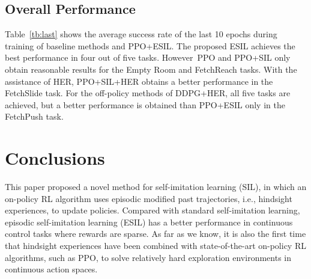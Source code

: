 \subsection{Overall Performance}
{Table~\ref{tb:last}} shows the average success rate of the last 10 epochs during training of baseline methods and PPO+ESIL. The proposed ESIL achieves the best performance in four out of five tasks. However~PPO and PPO+SIL  only obtain reasonable results for the Empty Room and FetchReach tasks. With the assistance of HER, PPO+SIL+HER obtains a better performance in the FetchSlide task. {For the off-policy methods of DDPG+HER, all five tasks are achieved, but a better performance is  obtained than PPO+ESIL only in the FetchPush task}.

\begin{table}[H]
  \caption{Average success rate $\pm$ standard error in the last 10 epochs over five random seeds on all~environments {(\textbf{bold} indicates the best result among all methods).}}
  \label{tb:last}
  \centering
\end{table}

\section{Conclusions}
\label{sec:conclusion}
This paper proposed a novel method for self-imitation learning (SIL), in which an on-policy RL algorithm uses episodic modified past trajectories, i.e., hindsight experiences, to update policies. Compared with standard self-imitation learning, episodic self-imitation learning (ESIL) has a better performance in continuous control tasks where rewards are sparse. As far as we know, it is also the first time that hindsight experiences have been combined with state-of-the-art on-policy RL algorithms, such as PPO, to solve relatively hard exploration environments in continuous action spaces.

